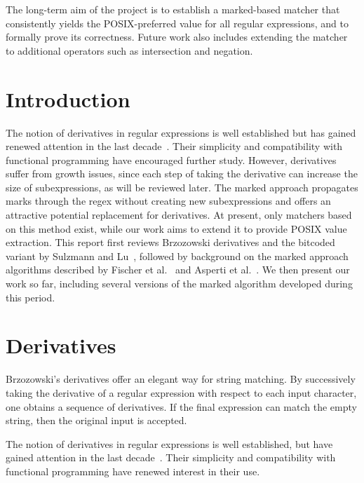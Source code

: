 \documentclass[12pt]{article}
\begin{document}
The long-term aim of the project is to establish a marked-based matcher that consistently yields the POSIX-preferred value for all regular expressions, and to formally prove its correctness.  
Future work also includes extending the matcher to additional operators such as intersection and negation.  

\newpage

\tableofcontents

\newpage

\section{Introduction}

The notion of derivatives in regular expressions is well established but has gained renewed attention in the last decade~\cite{Owens2009, Might2011}.  
Their simplicity and compatibility with functional programming have encouraged further study.  
However, derivatives suffer from growth issues, since each step of taking the derivative can increase the size of subexpressions, as will be reviewed later.  
The marked approach propagates marks through the regex without creating new subexpressions and offers an attractive potential replacement for derivatives.  
At present, only matchers based on this method exist, while our work aims to extend it to provide POSIX value extraction.  
This report first reviews Brzozowski derivatives and the bitcoded variant by Sulzmann and Lu~\cite{Sulzmann2014}, followed by background on the marked approach algorithms described by Fischer et al.~\cite{Fischer2010} and Asperti et al.~\cite{Asperti2010}.  
We then present our work so far, including several versions of the marked algorithm developed during this period.  

\section{Derivatives}

Brzozowski’s derivatives offer an elegant way for string matching. By successively taking the derivative of a regular
expression with respect to each input character, one obtains a sequence of derivatives. If the final expression can match 
the empty string, then the original input is accepted.

The notion of derivatives in regular expressions is well established, but have gained attention in the last 
decade~\cite{Owens2009, Might2011}. Their simplicity and compatibility with functional programming have renewed interest in
their use.
\end{document}
